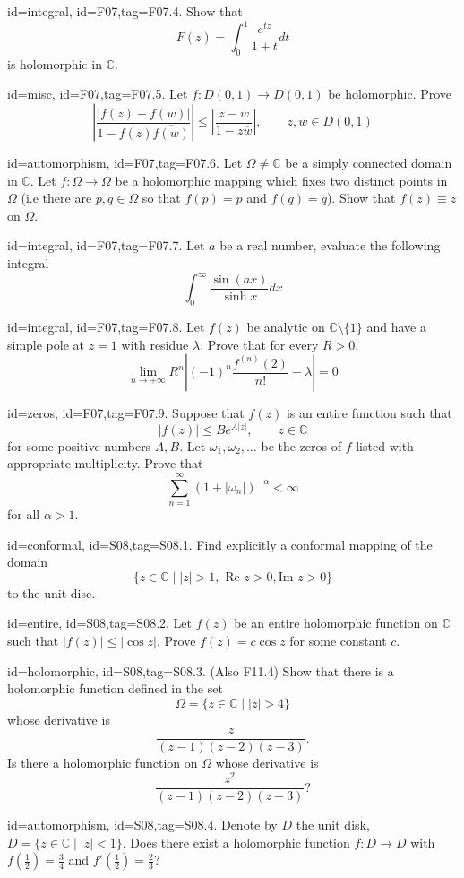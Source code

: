 \documentclass[12pt,letterpaper]{article}
\theoremstyle{plain}
\theoremstyle{definition}
\begin{document}
{\item[id=integral, id=F07,tag=F07.4.]
Show that
\[
	F(z) = \int_{0}^{1} \frac{e^{tz}}{1+t} dt
\]
is holomorphic in $\mathbb{C}$.

\item[id=misc, id=F07,tag=F07.5.]
Let $f : D(0,1) \rightarrow D(0,1)$ be holomorphic. Prove
\[
	\left| \frac{| f(z) - f(w) |}{1 - f(z)\overline{f(w)}} \right| \le \left| \frac{z-w}{1-z\overline{w}} \right|, \qquad z, w \in D(0,1)
\]

\item[id=automorphism, id=F07,tag=F07.6.]
Let $\Omega \ne \mathbb{C}$ be a simply connected domain in $\mathbb{C}$. Let $f : \Omega \rightarrow \Omega$ be a holomorphic mapping which fixes two distinct points in $\Omega$ (i.e there are $p,q \in \Omega$ so that $f(p) = p$ and $f(q) = q$). Show that $f(z) \equiv z$ on $\Omega$.

\item[id=integral, id=F07,tag=F07.7.]
Let $a$ be a real number, evaluate the following integral
\[
	\int_{0}^{\infty} \frac{\sin(ax)}{\sinh x} dx
\]

\item[id=integral, id=F07,tag=F07.8.]
Let $f(z)$ be analytic on $\mathbb{C} \setminus \{1\}$ and have a simple pole at $z = 1$ with residue $\lambda$. Prove that for every $R > 0$,
\[
	\lim_{n\rightarrow+\infty} R^n \left| (-1)^n\frac{f^{(n)}(2)}{n!} - \lambda \right| = 0
\]

\item[id=zeros, id=F07,tag=F07.9.]
Suppose that $f(z)$ is an entire function such that
\[
	| f(z) | \le B e^{A| z |}, \qquad z \in \mathbb{C}
\]
for some positive numbers $A, B$. Let $\omega_1, \omega_2,\ldots$ be the zeros of $f$ listed with appropriate multiplicity. Prove that
\[
	\sum_{n=1}^{\infty}(1+ | \omega_n |)^{-\alpha} < \infty
\]
for all $\alpha > 1$.


\item[id=conformal, id=S08,tag=S08.1.]
Find explicitly a conformal mapping of the domain
\[
	\{z \in \mathbb{C} \mid | z | > 1, \text{ Re }z > 0, \text{Im } z > 0 \}
\]
to the unit disc.

\item[id=entire, id=S08,tag=S08.2.]
Let $f(z)$ be an entire holomorphic function on $\mathbb{C}$ such that $| f(z) | \le | \cos z |$. Prove $f(z) = c \cos z$ for some constant $c$.

\item[id=holomorphic, id=S08,tag=S08.3.]
(Also F11.4) Show that there is a holomorphic function defined in the set
\[
	\Omega = \{z \in \mathbb{C} \mid | z | > 4\}
\]
whose derivative is
\[
	\frac{z}{(z-1)(z-2)(z-3)}.
\]
Is there a holomorphic function on $\Omega$ whose derivative is
\[
	\frac{z^2}{(z-1)(z-2)(z-3)}?
\]
\item[id=automorphism, id=S08,tag=S08.4.]
Denote by $D$ the unit disk, $D = \{z \in \mathbb{C} \mid | z | < 1\}$. Does there exist a holomorphic function $f : D \rightarrow D$ with $f(\frac{1}{2}) = \frac{3}{4}$ and $f'(\frac{1}{2}) = \frac{2}{3}$?


}
\end{document}
